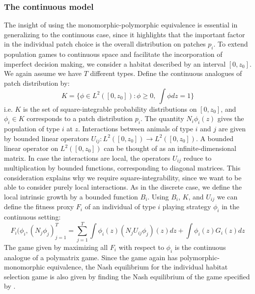 \subsubsection{The continuous model}
The insight of using the monomorphic-polymorphic equivalence is essential in generalizing to the continuous case, since it highlights that the important factor in the individual patch choice  is the overall distribution on patches $p_i$. To extend population games to continuous space and facilitate the incorporation of imperfect decision making, we consider a habitat described by an interval $[0,z_0]$. We again assume we have $T$ different types. Define the continuous analogues of patch distribution by:
\begin{equation}
  K = \{ \phi \in L^2([0,z_0]) : \phi \geq 0,~\int \phi dz = 1\}
  \label{eq:space_of_dists}
\end{equation}
i.e. $K$ is the set of square-integrable probability distributions on $[0,z_0]$, and $\phi_i \in K$ corresponds to a patch distribution $p_i$. The quantity $N_i \phi_i(z)$ gives the population of type $i$ at $z$. Interactions between animals of type $i$ and $j$ are given by bounded linear operators $U_{ij}: L^2([0,z_0]) \to L^2([0,z_0])$. A bounded linear operator on $L^2([0,z_0])$ can be thought of as an infinite-dimensional matrix. In case the interactions are local, the operators $U_{ij}$ reduce to multiplication by bounded functions, corresponding to diagonal matrices. This consideration explains why we require square-integrability, since we want to be able to consider purely local interactions. As in the discrete case, we define the local intrinsic growth by a bounded function $B_i$. Using $B_i$, $K$, and $U_{ij}$ we can define the fitness proxy $F_i$ of an individual of type $i$ playing strategy $\phi_i$ in the continuous setting:
\begin{equation}
  F_i(\phi_i, (N_j \phi_j)_{j=1}^T = \sum_{j=1}^T \int \phi_i(z) (N_j U_{ij} \phi_j)(z) dz + \int \phi_i(z) G_i(z) dz %
  \label{eq:utility}
\end{equation}
The game given by maximizing all $F_i$ with respect to $\phi_i$ is the continuous analogue of a polymatrix game. Since the game again has polymorphic-monomorphic equivalence, the Nash equilibrium for the individual habitat selection game is also given by finding the Nash equilibrium of the game specified by .

